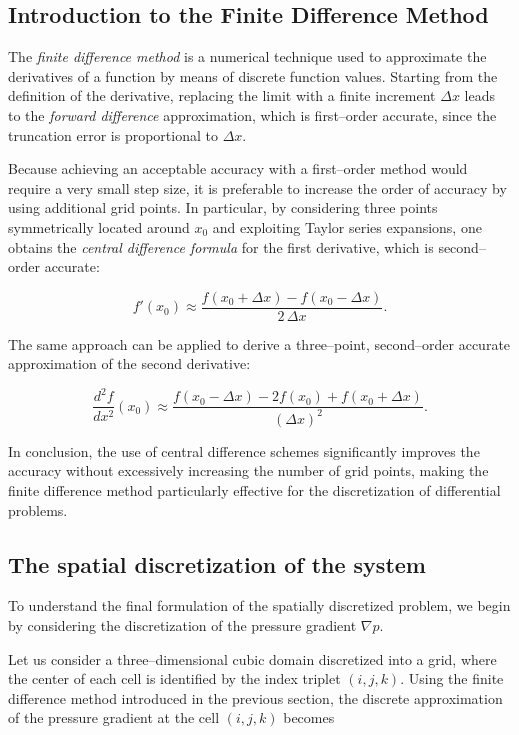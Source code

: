\documentclass[12pt]{article}
\begin{document}
\subsection{Introduction to the Finite Difference Method}

The \emph{finite difference method} is a numerical technique used to approximate
the derivatives of a function by means of discrete function values. Starting
from the definition of the derivative, replacing the limit with a finite
increment $\Delta x$ leads to the \emph{forward difference} approximation, which
is first--order accurate, since the truncation error is proportional to
$\Delta x$.

Because achieving an acceptable accuracy with a first--order method would
require a very small step size, it is preferable to increase the order of
accuracy by using additional grid points. In particular, by considering three
points symmetrically located around $x_0$ and exploiting Taylor series
expansions, one obtains the \emph{central difference formula} for the first
derivative, which is second--order accurate:

\[
f'(x_0) \approx
\frac{f(x_0 + \Delta x) - f(x_0 - \Delta x)}{2\,\Delta x}.
\]

The same approach can be applied to derive a three--point, second--order accurate
approximation of the second derivative:

\[
\frac{d^2 f}{dx^2}(x_0) \approx
\frac{f(x_0 - \Delta x) - 2f(x_0) + f(x_0 + \Delta x)}{(\Delta x)^2}.
\]

In conclusion, the use of central difference schemes significantly improves the
accuracy without excessively increasing the number of grid points, making the
finite difference method particularly effective for the discretization of
differential problems.


\subsection{The spatial discretization of the system}
To understand the final formulation of the spatially discretized problem, 
we begin by considering the discretization of the pressure gradient 
\(\nabla p\). 

Let us consider a three–dimensional cubic domain discretized into a grid, 
where the center of each cell is identified by the index triplet \((i,j,k)\). 
Using the finite difference method introduced in the previous section, 
the discrete approximation of the pressure gradient at the cell 
\((i,j,k)\) becomes
\end{document}
